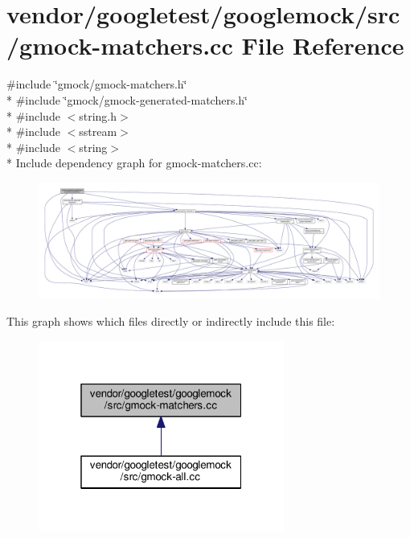 \hypertarget{gmock-matchers_8cc}{}\section{vendor/googletest/googlemock/src/gmock-\/matchers.cc File Reference}
\label{gmock-matchers_8cc}
{\ttfamily \#include \char`\"{}gmock/gmock-\/matchers.\+h\char`\"{}}\\*
{\ttfamily \#include \char`\"{}gmock/gmock-\/generated-\/matchers.\+h\char`\"{}}\\*
{\ttfamily \#include $<$string.\+h$>$}\\*
{\ttfamily \#include $<$sstream$>$}\\*
{\ttfamily \#include $<$string$>$}\\*
Include dependency graph for gmock-\/matchers.cc\+:\nopagebreak
\begin{figure}[H]
\begin{center}
\leavevmode
\includegraphics[width=350pt]{gmock-matchers_8cc__incl}
\end{center}
\end{figure}
This graph shows which files directly or indirectly include this file\+:\nopagebreak
\begin{figure}[H]
\begin{center}
\leavevmode
\includegraphics[width=229pt]{gmock-matchers_8cc__dep__incl}
\end{center}
\end{figure}
